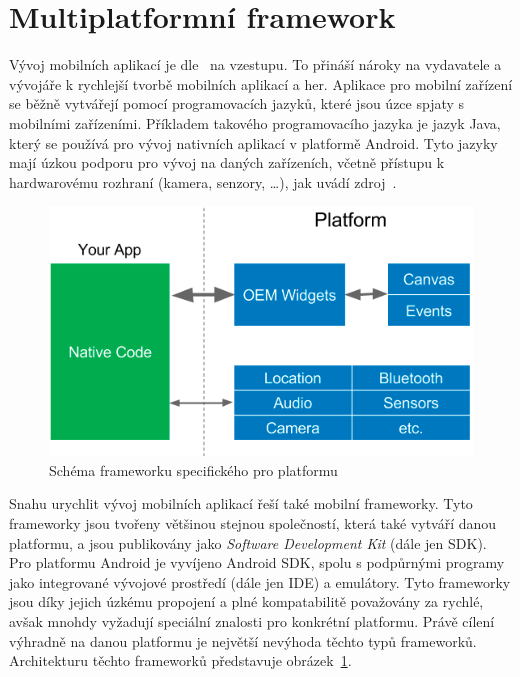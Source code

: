 \section{Multiplatformní framework}

Vývoj mobilních aplikací je dle~\cite{wepc_video_game_statistics} na vzestupu.
To přináší nároky na vydavatele a vývojáře k rychlejší tvorbě mobilních
aplikací a her. 
Aplikace pro mobilní zařízení se běžně vytvářejí pomocí programovacích jazyků,
které jsou úzce spjaty s mobilními zařízeními.
Příkladem takového programovacího jazyka je jazyk Java,
který se používá pro vývoj nativních aplikací v platformě Android.
Tyto jazyky mají úzkou podporu pro vývoj na daných zařízeních,
včetně přístupu k hardwarovému rozhraní (kamera, senzory, \dots{}),
jak uvádí zdroj~\cite{dashmagazine_mobile_frameworks}. 

\begin{figure}[ht!]
    \centering
    \includegraphics[width=\linewidth]{assets/technology-research/framework/platform_sdk.png}
    \caption{Schéma frameworku specifického pro platformu ~\cite{hackernoon_flutter}}
    \label{fig:framework_platform}
\end{figure}

Snahu urychlit vývoj mobilních aplikací řeší také mobilní frameworky.
Tyto frameworky jsou tvořeny většinou stejnou společností,
která také vytváří danou platformu,
a jsou publikovány jako \emph{Software Development Kit} (dále jen SDK).
\cite{dashmagazine_mobile_frameworks}
Pro platformu Android je vyvíjeno Android SDK,
spolu s podpůrnými programy jako integrované vývojové prostředí
(dále jen IDE) a emulátory.
Tyto frameworky jsou díky jejich úzkému propojení a plné kompatabilitě
považovány za rychlé,
avšak mnohdy vyžadují speciální znalosti pro konkrétní platformu.
Právě cílení výhradně na danou platformu je největší nevýhoda těchto typů
frameworků.
Architekturu těchto frameworků představuje obrázek~\ref{fig:framework_platform}.

